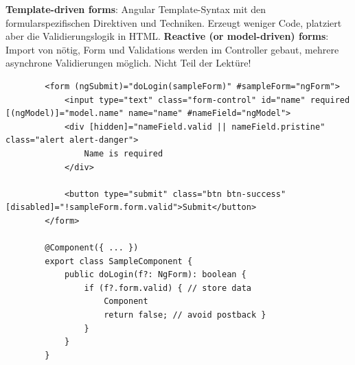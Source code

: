 \documentclass[10pt,landscape]{article}
\begin{document}
\begin{multicols}{3}
        \textbf{Template-driven forms}: Angular Template-Syntax mit den formularspezifischen Direktiven und Techniken.
        Erzeugt weniger Code, platziert aber die Validierungslogik in HTML.
        \textbf{Reactive (or model-driven) forms}: Import von  nötig, Form und Validations werden im Controller gebaut, mehrere asynchrone Validierungen möglich.
        Nicht Teil der Lektüre!

        \begin{lstlisting}
        <form (ngSubmit)="doLogin(sampleForm)" #sampleForm="ngForm">
            <input type="text" class="form-control" id="name" required [(ngModel)]="model.name" name="name" #nameField="ngModel">
            <div [hidden]="nameField.valid || nameField.pristine" class="alert alert-danger">
                Name is required
            </div>

            <button type="submit" class="btn btn-success" [disabled]="!sampleForm.form.valid">Submit</button>
        </form>

        @Component({ ... })
        export class SampleComponent {
            public doLogin(f?: NgForm): boolean {
                if (f?.form.valid) { // store data
                    Component
                    return false; // avoid postback }
                }
            }
        }
        \end{lstlisting}
    \end{multicols}
\end{document}
